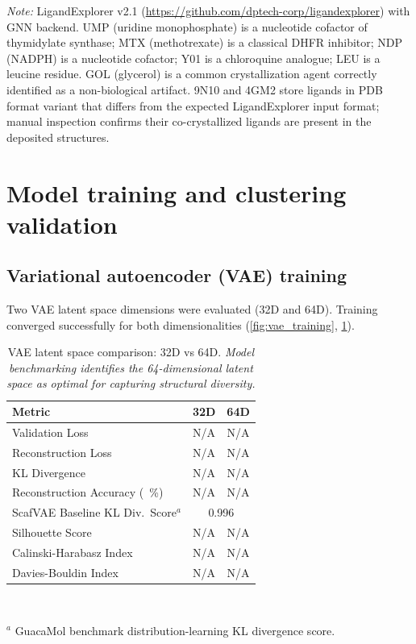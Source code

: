 \documentclass[journal=jcisd8,manuscript=suppinfo]{achemso}
\begin{document}
\begin{table}[htbp]
\begin{footnotesize}
\textit{Note:} LigandExplorer v2.1 (\url{https://github.com/dptech-corp/ligandexplorer}) with GNN backend. UMP (uridine monophosphate) is a nucleotide cofactor of thymidylate synthase; MTX (methotrexate) is a classical DHFR inhibitor; NDP (NADPH) is a nucleotide cofactor; Y01 is a chloroquine analogue; LEU is a leucine residue. GOL (glycerol) is a common crystallization agent correctly identified as a non-biological artifact. 9N10 and 4GM2 store ligands in PDB format variant that differs from the expected LigandExplorer input format; manual inspection confirms their co-crystallized ligands are present in the deposited structures.
\end{footnotesize}
\end{table}

\clearpage

\section*{Model training and clustering validation}

\subsection*{Variational autoencoder (VAE) training}

Two VAE latent space dimensions were evaluated (32D and 64D). Training converged successfully for both dimensionalities (\cref{fig:vae_training}, \cref{tab:vae_comparison}).

\begin{table}[ht]
\centering  \caption{VAE latent space comparison: 32D vs 64D. \textit{Model benchmarking identifies the 64-dimensional latent space as optimal for capturing structural diversity.}}
\label{tab:vae_comparison}
\small
\begin{tabular}{lcc}
\toprule
\textbf{Metric} & \textbf{32D} & \textbf{64D} \\
\midrule
Validation Loss & N/A & N/A \\
Reconstruction Loss & N/A & N/A \\
KL Divergence & N/A & N/A \\
Reconstruction Accuracy (\qty{}{\percent}) & N/A & N/A \\
ScafVAE Baseline KL Div.\ Score$^a$ \cite{tiejundong2023scafvae} & \multicolumn{2}{c}{\num{0.996}} \\
\midrule
Silhouette Score & N/A & N/A \\
Calinski-Harabasz Index & N/A & N/A \\
Davies-Bouldin Index & N/A & N/A \\
\bottomrule
\end{tabular}
\vspace{0.3em}\\
\begin{footnotesize}
$^a$ GuacaMol benchmark distribution-learning KL divergence score.
\end{footnotesize}
\end{table}
\end{document}
